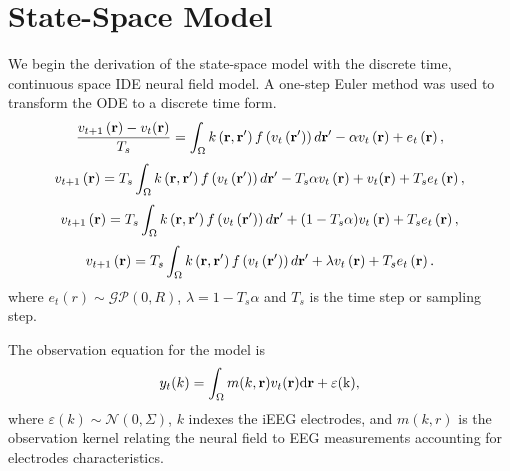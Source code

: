 \documentclass[onecolumn,draftcls]{IEEEtran}
\begin{document}
\section{State-Space Model}
We begin the derivation of the state-space model with the discrete time, continuous space IDE neural field model. A one-step Euler method was used to transform the ODE to a discrete time form.
\begin{equation}\label{SystemEq}
\frac{v_{t + 1}\left( \mathbf{r} \right) - v_t(\mathbf{r})}{T_s} = \int_\Omega  {k\left( {{\bf{r}} , {\bf{r'}}} \right)f\left( {{v_t}\left( {{\bf{r'}}} \right)} \right)d{\bf{r'}}}  - \alpha {v_t}\left( {\bf{r}} \right) + e_t\left( {\mathbf{r}} \right),
\end{equation}
\begin{equation}\label{SystemEq}
v_{t + 1}\left( \mathbf{r} \right)  = T_s\int_\Omega  {k\left( {{\bf{r}} , {\bf{r'}}} \right)f\left( {{v_t}\left( {{\bf{r'}}} \right)} \right)d{\bf{r'}}} - T_s\alpha {v_t}\left( {\bf{r}} \right) + v_t(\mathbf{r}) + T_se_t\left( {\mathbf{r}} \right),
\end{equation}
\begin{equation}\label{SystemEq}
v_{t + 1}\left( \mathbf{r} \right)  = T_s\int_\Omega  {k\left( {{\bf{r}} , {\bf{r'}}} \right)f\left( {{v_t}\left( {{\bf{r'}}} \right)} \right)d{\bf{r'}}} + (1 - T_s\alpha) v_t\left( {\bf{r}} \right) + T_se_t\left( {\mathbf{r}} \right),
\end{equation}
\begin{equation}\label{SystemEq}
v_{t + 1}\left( \mathbf{r} \right)  = T_s\int_\Omega  {k\left( {{\bf{r}} , {\bf{r'}}} \right)f\left( {{v_t}\left( {{\bf{r'}}} \right)} \right)d{\bf{r'}}} + \lambda v_t\left( {\bf{r}} \right) + T_se_t\left( {\mathbf{r}} \right).
\end{equation}
where $e_t(r)\sim \mathcal{GP}(0,R)$, $\lambda = 1-T_s\alpha$ and $T_s$ is the time step or sampling step.

The observation equation for the model is
\begin{equation}\label{ObservationEquation}
    y_t( k ) = \int_\Omega  m( k,\mathbf{r} )v_t( \mathbf{r}\rm ) d\mathbf{r}  + \varepsilon ( k ),
\end{equation}
where $\varepsilon( k )\sim\mathcal{N}(0,\Sigma)$, $k$ indexes the iEEG electrodes, and $m(k,r)$ is the observation kernel relating the neural field to EEG measurements accounting for electrodes characteristics.
\end{document}
